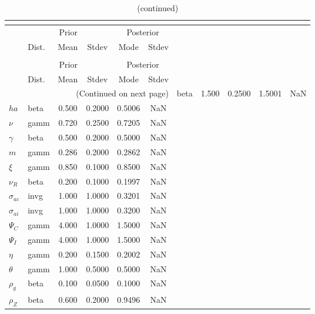  
\begin{center}
\begin{longtable}{llcccc} 
\caption{Results from posterior maximization (parameters)}\\
 \label{Table:Posterior:1}\\
\toprule 
  & \multicolumn{3}{c}{Prior}  &  \multicolumn{2}{c}{Posterior} \\
  \cmidrule(r{.75em}){2-4} \cmidrule(r{.75em}){5-6}
  & Dist. & Mean  & Stdev & Mode & Stdev \\ 
\midrule \endfirsthead 
\caption{(continued)}\\
 \bottomrule 
  & \multicolumn{3}{c}{Prior}  &  \multicolumn{2}{c}{Posterior} \\
  \cmidrule(r{.75em}){2-4} \cmidrule(r{.75em}){5-6}
  & Dist. & Mean  & Stdev & Mode & Stdev \\ 
\midrule \endhead 
\bottomrule \multicolumn{6}{r}{(Continued on next page)}\endfoot 
\bottomrule\endlastfoot 
${\sigma}$ & beta &   1.500 & 0.2500 &   1.5001 &     NaN \\ 
${ha}$ & beta &   0.500 & 0.2000 &   0.5006 &     NaN \\ 
$\nu$ & gamm &   0.720 & 0.2500 &   0.7205 &     NaN \\ 
$\gamma$ & beta &   0.500 & 0.2000 &   0.5000 &     NaN \\ 
${m}$ & gamm &   0.286 & 0.2000 &   0.2862 &     NaN \\ 
$\xi$ & gamm &   0.850 & 0.1000 &   0.8500 &     NaN \\ 
${\nu_R}$ & beta &   0.200 & 0.1000 &   0.1997 &     NaN \\ 
${\sigma_{ac}}$ & invg &   1.000 & 1.0000 &   0.3201 &     NaN \\ 
${\sigma_{ai}}$ & invg &   1.000 & 1.0000 &   0.3200 &     NaN \\ 
${\Psi_C}$ & gamm &   4.000 & 1.0000 &   1.5000 &     NaN \\ 
${\Psi_I}$ & gamm &   4.000 & 1.0000 &   1.5000 &     NaN \\ 
${\eta}$ & gamm &   0.200 & 0.1500 &   0.2002 &     NaN \\ 
${\theta}$ & gamm &   1.000 & 0.5000 &   0.5000 &     NaN \\ 
${\rho_g}$ & beta &   0.100 & 0.0500 &   0.1000 &     NaN \\ 
${\rho_Z}$ & beta &   0.600 & 0.2000 &   0.9496 &     NaN \\ 

\end{longtable}
\end{center}
